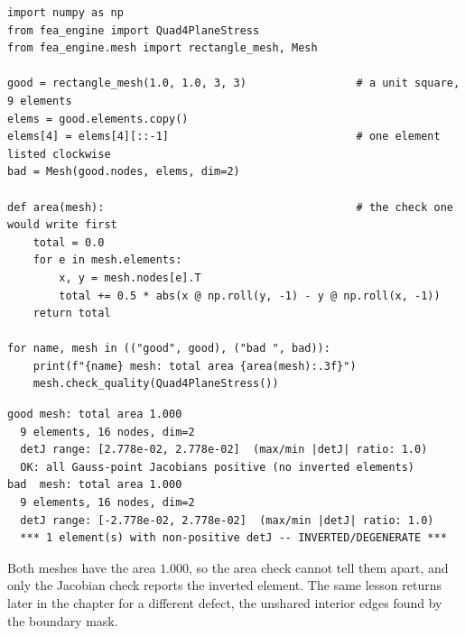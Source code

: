 \begin{lstlisting}[caption={An element listed clockwise passes an area check and fails the Jacobian check (run with the package on the path).},label={lst:me-try}]
import numpy as np
from fea_engine import Quad4PlaneStress
from fea_engine.mesh import rectangle_mesh, Mesh

good = rectangle_mesh(1.0, 1.0, 3, 3)                 # a unit square, 9 elements
elems = good.elements.copy()
elems[4] = elems[4][::-1]                             # one element listed clockwise
bad = Mesh(good.nodes, elems, dim=2)

def area(mesh):                                       # the check one would write first
    total = 0.0
    for e in mesh.elements:
        x, y = mesh.nodes[e].T
        total += 0.5 * abs(x @ np.roll(y, -1) - y @ np.roll(x, -1))
    return total

for name, mesh in (("good", good), ("bad ", bad)):
    print(f"{name} mesh: total area {area(mesh):.3f}")
    mesh.check_quality(Quad4PlaneStress())
\end{lstlisting}

\begin{lstlisting}[numbers=none,language={},keywordstyle={},commentstyle={},frame=single,aboveskip=2pt]
good mesh: total area 1.000
  9 elements, 16 nodes, dim=2
  detJ range: [2.778e-02, 2.778e-02]  (max/min |detJ| ratio: 1.0)
  OK: all Gauss-point Jacobians positive (no inverted elements)
bad  mesh: total area 1.000
  9 elements, 16 nodes, dim=2
  detJ range: [-2.778e-02, 2.778e-02]  (max/min |detJ| ratio: 1.0)
  *** 1 element(s) with non-positive detJ -- INVERTED/DEGENERATE ***
\end{lstlisting}

Both meshes have the area $1.000$, so the area check cannot tell them apart, and only the Jacobian check reports the inverted element. The same lesson returns later in the chapter for a different defect, the unshared interior edges found by the boundary mask.

